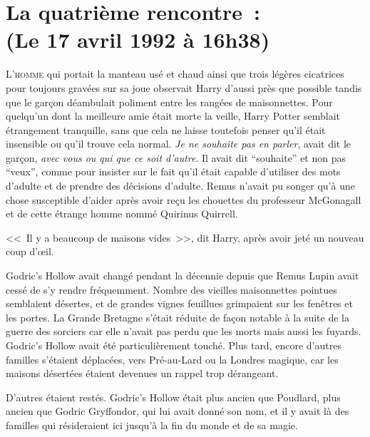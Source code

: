
\section[La quatrième rencontre~:\\
(Le 17 avril 1992 à 16h38)]{La quatrième rencontre~:\\
(Le 17 avril 1992 à 16h38)\protect\footnotemark}

\lettrine{L}{'homme} qui portait la manteau usé et chaud ainsi que trois légères cicatrices pour toujours gravées sur sa joue observait Harry d'aussi près que possible tandis que le garçon déambulait poliment entre les rangées de maisonnettes. Pour quelqu'un dont la meilleure amie était morte la veille, Harry Potter semblait étrangement tranquille, sans que cela ne laisse toutefois penser qu'il était insensible ou qu'il trouve cela normal. \emph{Je ne souhaite pas en parler}, avait dit le garçon, \emph{avec vous ou qui que ce soit d'autre}. Il avait dit “souhaite” et non pas “veux”, comme pour insister sur le fait qu'il était capable d'utiliser des mots d'adulte et de prendre des décisions d'adulte. Remus n'avait pu songer qu'à une chose susceptible d'aider après avoir reçu les chouettes du professeur McGonagall et de cette étrange homme nommé Quirinus Quirrell.

<<~Il y a beaucoup de maisons vides~>>, dit Harry, après avoir jeté un nouveau coup d'œil.

Godric's Hollow avait changé pendant la décennie depuis que Remus Lupin avait cessé de s'y rendre fréquemment. Nombre des vieilles maisonnettes pointues semblaient désertes, et de grandes vignes feuillues grimpaient sur les fenêtres et les portes. La Grande Bretagne s'était réduite de façon notable à la suite de la guerre des sorciers car elle n'avait pas perdu que les morts mais aussi les fuyards. Godric's Hollow avait été particulièrement touché. Plus tard, encore d'autres familles s'étaient déplacées, vers Pré-au-Lard ou la Londres magique, car les maisons désertées étaient devenues un rappel trop dérangeant.

D'autres étaient restés. Godric's Hollow était plus ancien que Poudlard, plus ancien que Godric Gryffondor, qui lui avait donné son nom, et il y avait là des familles qui résideraient ici jusqu'à la fin du monde et de sa magie.

